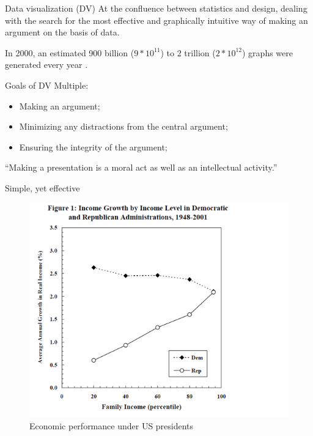\documentclass[12pt,english,pdf,dvipsnames,handout]{beamer}
\begin{document}
\begin{frame}{Data visualization (DV)}
  At the confluence between statistics and design, dealing with the search for the most effective and graphically intuitive way of making an argument on the basis of data.\bigskip

  In 2000, an estimated 900 billion ($9*10^{11}$) to 2 trillion ($2*10^{12}$) graphs were generated every year \cite{Tufte2001}.
  
\end{frame}


\begin{frame}{Goals of DV}
  Multiple:

  \begin{itemize}
  \item Making an argument;
  \pause
  \item Minimizing any distractions from the central argument;
  \pause
  \item Ensuring the integrity of the argument;
  \end{itemize}
\bigskip
\pause
``Making a presentation is a moral act as well as an intellectual activity.'' \cite[p.~141]{Tufte2006}
  
\end{frame}


\begin{frame}{Simple, yet effective}

\begin{figure}
	\centering
	\includegraphics[scale=0.4]{../04-graphs/27_GOP_Dem_Bartels}
	\caption{Economic performance under US presidents \cite{Bartels2008a}}
\end{figure}

\end{frame}
\end{document}
